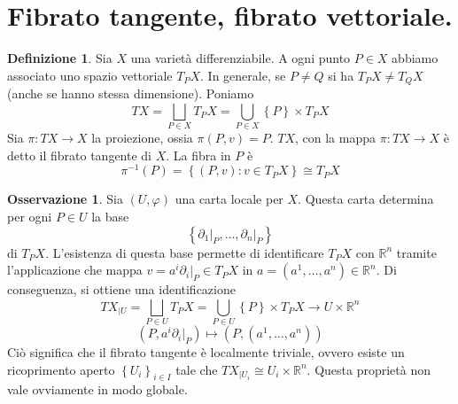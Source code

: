\documentclass[a4paper,11pt]{article}
\theoremstyle{definition}
\newtheorem{osservazione}{Osservazione}[section]
\newtheorem{definizione}{Definizione}[section]
\theoremstyle{theorem}
\begin{document}
\section{Fibrato tangente, fibrato vettoriale.}
\begin{definizione}
	Sia $X$ una varietà differenziabile. A ogni punto $P\in X$ abbiamo associato uno spazio vettoriale $T_PX$. In generale, se $P\neq Q$ si ha $T_PX\neq T_QX$ (anche se hanno stessa dimensione). Poniamo
	\[TX=\bigsqcup_{P\in X}T_PX=\bigcup_{P\in X}\left\{P\right\}\times T_PX\]
	Sia $\pi\colon TX\to X$ la proiezione, ossia $\pi(P,v)=P$.
	$TX$, con la mappa $\pi\colon TX\to X$ è detto il fibrato tangente di $X$. La fibra in $P$ è 
	\[\pi^{-1}(P)=\left\{(P,v):v\in T_PX\right\}\cong T_PX\]
\end{definizione}
\begin{osservazione}
	Sia $(U,\varphi)$ una carta locale per $X$. Questa carta determina per ogni $P\in U$ la base
	\[\left\{\left.\partial_1\right|_{P},\dots,\left.\partial_n\right|_{P}\right\}\]
	di $T_PX$. L'esistenza di questa base permette di identificare $T_PX$ con $\mathbb{R}^n$ tramite l'applicazione che mappa $v=a^i\left.\partial_i\right|_{P}\in T_PX$ in $a=(a^1,\dots,a^n)\in\mathbb{R}^n$. Di conseguenza, si ottiene una identificazione 
	\[TX_{|U}=\bigsqcup_{P\in U}T_PX=\bigcup_{P\in U}\left\{P\right\}\times T_PX\rightarrow U\times\mathbb{R}^n\]
	\[\left(P,a^i\left.\partial_i\right|_{P}\right)\mapsto(P,(a^1,\dots,a^n))\]
	Ciò significa che il fibrato tangente è localmente triviale, ovvero esiste un ricoprimento aperto $\left\{U_i\right\}_{i\in I}$ tale che $TX_{|U_i}\cong U_i\times\mathbb{R}^n$. Questa proprietà non vale ovviamente in modo globale. 
\end{osservazione}
\end{document}
